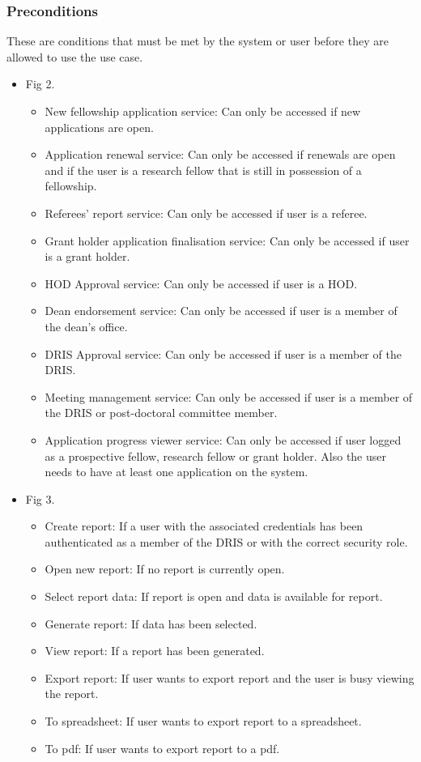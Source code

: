 \documentclass[12pt]{article}
\begin{document}
\subsubsection{Preconditions}
These are conditions that must be met by the system or user before they are allowed to use the use case.\\
\begin{itemize}
	\item Fig 2.
		\begin{itemize}
			\item New fellowship application service: Can only be accessed if new applications are open.
			\item Application renewal service: Can only be accessed if renewals are open and if the user is a research fellow that is still in possession of a fellowship.
			\item Referees' report service:  Can only be accessed if user is a referee.
			\item Grant holder application finalisation service:  Can only be accessed if user is a grant holder.
			\item HOD Approval service:  Can only be accessed if user is a HOD.
			\item Dean endorsement service:  Can only be accessed if user is a member of the dean's office.
			\item DRIS Approval service:  Can only be accessed if user is a member of the DRIS.
			\item Meeting management service:  Can only be accessed if user is a member of the DRIS or post-doctoral committee member.
			\item Application progress viewer service: Can only be accessed if user logged as a prospective fellow, research fellow or grant holder. Also the user needs to have at least one application on the system.	
		\end{itemize}
	
	\item Fig 3.
		\begin{itemize}
			\item Create report: If a user with the associated credentials has been authenticated as a member of the DRIS or with the correct security role.
			\item Open new report: If no report is currently open.
			\item Select report data: If report is open and data is available for report.
			\item Generate report: If data has been selected.
			\item View report: If a report has been generated.
			\item Export report: If user wants to export report and the user is busy viewing the report.
			\item To spreadsheet: If user wants to export report to a spreadsheet.
			\item To pdf: If user wants to export report to a pdf.	
		\end{itemize}
	

\end{itemize}
\end{document}
